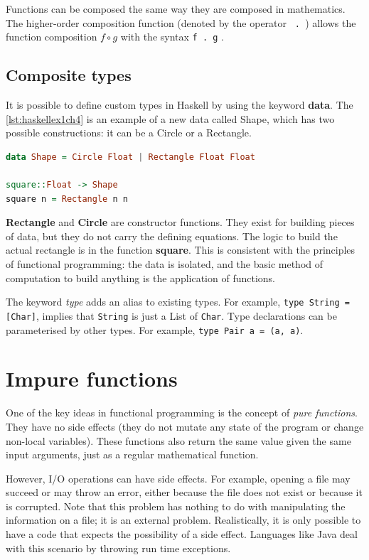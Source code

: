Functions can be composed the same way they are composed in mathematics. The higher-order composition function (denoted by the operator \lstinline! . !) allows the function composition $ f \circ g $ with the syntax \lstinline!f . g! .

\subsection{Composite types}

It is possible to define custom types in Haskell by using the keyword \textbf{data}. The \cref{lst:haskellex1ch4} is an example of a new data called Shape, which has two possible constructions: it can be a Circle or a Rectangle.

\begin{lstlisting}[language=Haskell, label=getinfo, caption={Custom types}, captionpos=b, label={lst:haskellex1ch4}]
data Shape = Circle Float | Rectangle Float Float

square::Float -> Shape
square n = Rectangle n n 

\end{lstlisting} 

\textbf{Rectangle} and \textbf{Circle} are constructor functions. They exist for building pieces of data, but they do not carry the defining equations. The logic to build the actual rectangle is in the function \textbf{square}. This is consistent with the principles of functional programming: the data is isolated, and the basic method of computation to build anything is the application of functions.

The keyword \textit{type} adds an alias to existing types. For example, \lstinline!type String = [Char]!, implies that \lstinline!String! is just a List of \lstinline!Char!. Type declarations can be parameterised by other types. For example, \lstinline!type Pair a = (a, a)!.

\section{Impure functions}
\label{sideeffects}

One of the key ideas in functional programming is the concept of \textit{pure functions}. They have no side effects (they do not mutate any state of the program or change non-local variables). These functions also return the same value given the same input arguments, just as a regular mathematical function.

However, I/O operations can have side effects. For example, opening a file may succeed or may throw an error, either because the file does not exist or because it is corrupted. Note that this problem has nothing to do with manipulating the information on a file; it is an external problem. Realistically, it is only possible to have a code that expects the possibility of a side effect. Languages like Java deal with this scenario by throwing run time exceptions. 

